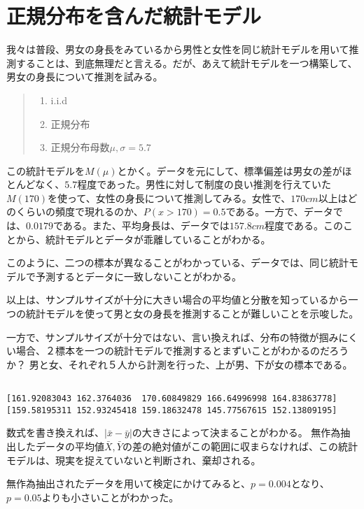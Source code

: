 \section{正規分布を含んだ統計モデル}
我々は普段、男女の身長をみているから男性と女性を同じ統計モデルを用いて推測することは、到底無理だと言える。だが、あえて統計モデルを一つ構築して、男女の身長について推測を試みる。
\begin{quote}
    \begin{enumerate}[(1)]
\item i.i.d
\item 正規分布
\item 正規分布母数$\mu,\sigma=5.7$
\end{enumerate}
\end{quote}
この統計モデルを$M(\mu)$とかく。データを元にして、標準偏差は男女の差がほとんどなく、$5.7$程度であった。男性に対して制度の良い推測を行えていた$M(170)$を使って、女性の身長について推測してみる。女性で、$170cm$以上はどのくらいの頻度で現れるのか、$P(x>170)=0.5$である。一方で、データでは、$0.0179$である。また、平均身長は、データでは$157.8cm$程度である。このことから、統計モデルとデータが乖離していることがわかる。

\fi
{}
このように、二つの標本が異なることがわかっている、データでは、同じ統計モデルで予測するとデータに一致しないことがわかる。
\fi

以上は、サンプルサイズが十分に大きい場合の平均値と分散を知っているから一つの統計モデルを使って男と女の身長を推測することが難しいことを示唆した。


一方で、サンプルサイズが十分ではない、言い換えれば、分布の特徴が掴みにくい場合、２標本を一つの統計モデルで推測するとまずいことがわかるのだろうか？
男と女、それぞれ５人から計測を行った、上が男、下が女の標本である。
\begin{lstlisting}

[161.92083043 162.3764036  170.60849829 166.64996998 164.83863778]
[159.58195311 152.93245418 159.18632478 145.77567615 152.13809195]
\end{lstlisting}



数式を書き換えれば、$|\bar{x}-\bar{y}|$の大きさによって決まることがわかる。
無作為抽出したデータの平均値$\bar{X},\bar{Y}$の差の絶対値がこの範囲に収まらなければ、この統計モデルは、現実を捉えていないと判断され、棄却される。

無作為抽出されたデータを用いて検定にかけてみると、$p=0.004$となり、$p=0.05$よりも小さいことがわかった。

\fi
